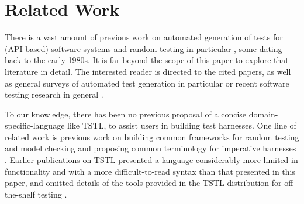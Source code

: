 \section{Related Work}

There is a vast amount of previous work on automated generation of
tests for (API-based) software systems
\cite{Pacheco,FA11,GodefroidKS05} and random testing in particular
\cite{ICSEDiff,Pacheco,AMFL11,ARTChen,ISSTAART,FASE,HamletOnly,Hamlet94,ClaessenH00,CiupaLOM07,RandFormal,woda08,andrews-etal-rute-rt,ASE08,evalrand,csmith},
some dating back to the early 1980s. It is far beyond the scope of
this paper to explore that literature in detail.  The interested
reader is directed to the cited papers, as well as general surveys of
automated test generation in particular \cite{anand2013orchestrated}
or recent software testing research in general \cite{orsofuse}.  



To our knowledge, there has been no previous proposal of a concise
domain-specific-language \cite{Fow10} like TSTL, to assist users in building test
harnesses.  One line of related work is previous work on
building common frameworks for random testing and model checking
\cite{woda08} and proposing common terminology for imperative
harnesses \cite{woda12}.  Earlier publications on TSTL \cite{NFM15,ISSTA15} presented a
language considerably more limited in functionality and with a more
difficult-to-read syntax than that presented in this paper, and
omitted details of the tools provided in the TSTL distribution for
off-the-shelf testing \cite{tstl}.

